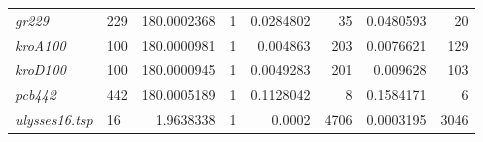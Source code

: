 \begin{table}[H]
\begin{tabular}{llrrrrrr}
  \textit{gr229}         & 229        & 180.0002368                                                                                 & 1                                                                             & 0.0284802                                                                               & 35                                                                            & 0.0480593                                                                                 & 20                                                                              \\
  \textit{kroA100}       & 100        & 180.0000981                                                                                 & 1                                                                             & 0.004863                                                                                & 203                                                                           & 0.0076621                                                                                 & 129                                                                             \\
  \textit{kroD100}       & 100        & 180.0000945                                                                                 & 1                                                                             & 0.0049283                                                                               & 201                                                                           & 0.009628                                                                                  & 103                                                                             \\
  \textit{pcb442}        & 442        & 180.0005189                                                                                 & 1                                                                             & 0.1128042                                                                               & 8                                                                             & 0.1584171                                                                                 & 6                                                                               \\
  \textit{ulysses16.tsp} & 16         & 1.9638338                                                                                   & 1                                                                             & 0.0002                                                                                  & 4706                                                                          & 0.0003195                                                                                 & 3046                                                                            \\

\end{tabular}
\end{table}

